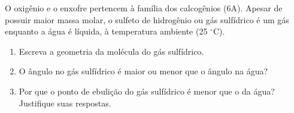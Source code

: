O oxigênio e o enxofre pertencem à família dos calcogênios (6A).
Apesar de possuir maior massa molar, o sulfeto de hidrogênio ou gás sulfídrico  é um gás enquanto a água é líquida, à temperatura ambiente (25 $^\circ$C).

\begin{enumerate}[label = (\alph*)]
	\item Escreva a geometria da molécula do gás sulfídrico.
	\item O ângulo  no gás sulfídrico é maior ou menor que o ângulo  na água?
	\item Por que o ponto de ebulição do gás sulfídrico é menor que o da água? Justifique suas respostas. 
\end{enumerate}
